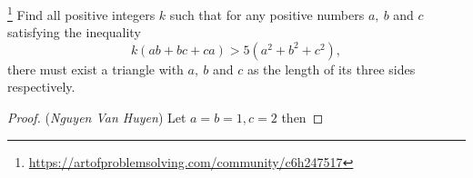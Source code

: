 \documentclass[12pt,a4paper]{book}
\begin{document}
\begin{pro_no_count}[CGMO 2002] \footnote{\url{https://artofproblemsolving.com/community/c6h247517}}
Find all positive integers $ k$ such that for any positive numbers $a, \ b$ and $ c$ satisfying the inequality 
\[ k(ab + bc + ca) > 5(a^2 + b^2 + c^2),\]
there must exist a triangle with $a, \ b$ and $ c$ as the length of its three sides respectively.
\end{pro_no_count}

\begin{proof}
(\textit{Nguyen Van Huyen}) Let $a=b=1,c=2$ then 
\end{proof}
\end{document}
